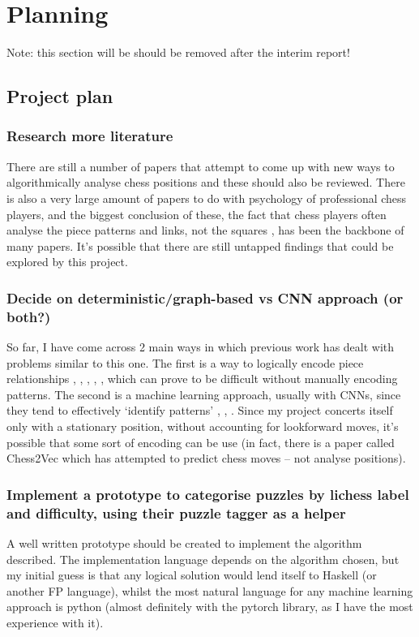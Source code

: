 \chapter{Planning}
Note: this section will be should be removed after the interim report!
\section{Project plan}

\subsection{Research more literature}
There are still a number of papers that attempt to come up with new ways to
algorithmically analyse chess positions and these should also be reviewed. There
is also a very large amount of papers to do with psychology of professional chess
players, and the biggest conclusion of these, the fact that chess players often
analyse the piece patterns and links, not the squares \cite{thoughtAndChoice}, 
has been the backbone of many papers. It's possible that there are still untapped
findings that could be explored by this project. 

\subsection{Decide on deterministic/graph-based vs CNN approach (or both?)}
So far, I have come across 2 main ways in which previous work has dealt with
problems similar to this one. The first is a way to logically encode piece
relationships \cite{chessPatterns}, \cite{bilalic2010mechanisms}, \cite{chessLanguage}, 
\cite{cql}, \cite{lichessTagger}, which can prove to be difficult without manually
encoding patterns. The second is a machine learning approach, usually with CNNs,
since they tend to effectively `identify patterns' \cite{chessCNN}, \cite{chessKernel},
\cite{middlegamePatterns}. Since my project concerts itself only with a stationary 
position, without accounting for lookforward moves, it's possible that some sort
of encoding can be use (in fact, there is a paper called Chess2Vec \cite{chess2vec}
which has attempted to predict chess moves -- not analyse positions).


\subsection{Implement a prototype to categorise puzzles by lichess label and difficulty, using
their puzzle tagger as a helper}
A well written prototype should be created to implement the algorithm described.
The implementation language depends on the algorithm chosen, but my initial guess
is that any logical solution would lend itself to Haskell (or another FP language),
whilst the most natural language for any machine learning approach is python (almost
definitely with the pytorch library, as I have the most experience with it). 

